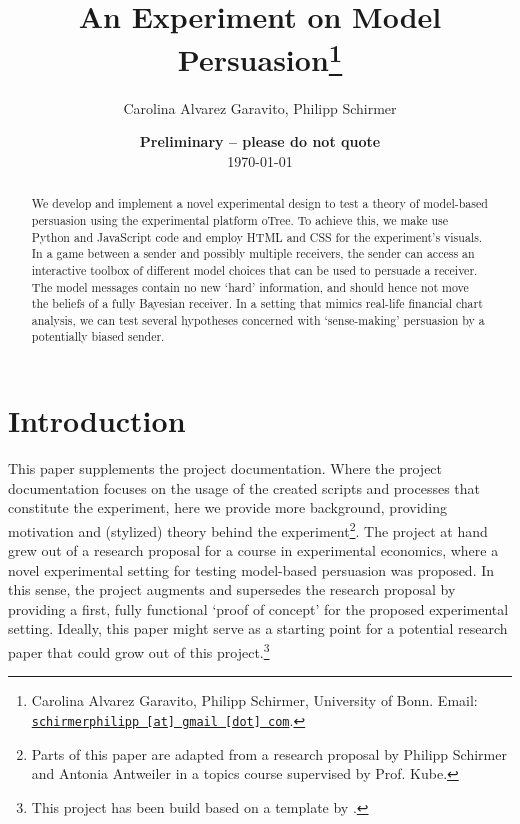 \documentclass[11pt, a4paper, leqno]{article}
\begin{document}
\title{An Experiment on Model Persuasion\thanks{Carolina Alvarez Garavito, Philipp Schirmer, University of Bonn. Email: \href{mailto:schirmerphilipp@gmail.com}{\nolinkurl{schirmerphilipp [at] gmail [dot] com}}.}}

\author{Carolina Alvarez Garavito, Philipp Schirmer}

\date{
    {\bf Preliminary -- please do not quote}
    \\[1ex]
    \today
}

\maketitle


\begin{abstract}
    We develop and implement a novel experimental design to test a theory of model-based persuasion using the 
    experimental platform oTree. To achieve this, we make use Python and JavaScript code and employ HTML and CSS for the experiment's visuals. In a game between a sender and possibly multiple receivers, the sender can access an interactive toolbox of different model choices that can be used to persuade a receiver. The model messages contain no
    new `hard' information, and should hence not move the beliefs of a fully Bayesian receiver. In a setting that mimics real-life financial chart analysis, we can test several hypotheses concerned with `sense-making' persuasion by a potentially biased sender.
\end{abstract}
\clearpage

\section{Introduction} %
\label{sec:introduction}

This paper supplements the project documentation. Where the project documentation focuses on the usage of the created scripts and processes that constitute the experiment, here we provide more background, providing motivation and (stylized) theory behind the experiment\footnote{Parts of this paper are adapted from a research proposal by Philipp Schirmer and Antonia Antweiler in a topics course supervised by Prof. Kube.}. The project at hand grew out of a research proposal for a course in experimental economics, where a novel experimental setting for testing model-based persuasion was proposed. In this sense, the project augments and supersedes the research proposal by providing a first, fully functional `proof of concept' for the proposed experimental setting. Ideally, this paper might serve as a starting point for a potential research paper that could grow out of this project.\footnote{This project has been build based on a template by \cite{GaudeckerEconProjectTemplates}.}
\end{document}

